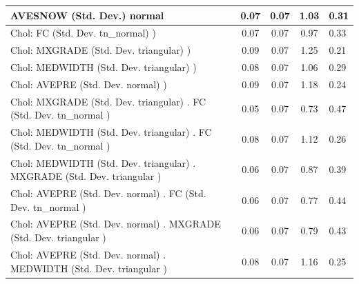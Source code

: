 \begin{table}
\begin{center}
\begin{tabular}{|l|l|c|c|c|l|}
			\hline
			AVESNOW (Std. Dev.) normal &  & 0.07 & 0.07 & 1.03 & 0.31 \\
			\hline
			 Chol: FC (Std. Dev. tn_normal) ) &  & 0.07 & 0.07 & 0.97 & 0.33 \\
			\hline
			 Chol: MXGRADE (Std. Dev. triangular) ) &  & 0.09 & 0.07 & 1.25 & 0.21 \\
			\hline
			 Chol: MEDWIDTH (Std. Dev. triangular) ) &  & 0.08 & 0.07 & 1.06 & 0.29 \\
			\hline
			 Chol: AVEPRE (Std. Dev. normal) ) &  & 0.09 & 0.07 & 1.18 & 0.24 \\
			\hline
			 Chol: MXGRADE (Std. Dev. triangular) . FC (Std. Dev.   tn_normal ) &  & 0.05 & 0.07 & 0.73 & 0.47 \\
			\hline
			 Chol: MEDWIDTH (Std. Dev. triangular) . FC (Std. Dev.   tn_normal ) &  & 0.08 & 0.07 & 1.12 & 0.26 \\
			\hline
			 Chol: MEDWIDTH (Std. Dev. triangular) . MXGRADE (Std. Dev.   triangular ) &  & 0.06 & 0.07 & 0.87 & 0.39 \\
			\hline
			 Chol: AVEPRE (Std. Dev. normal) . FC (Std. Dev.   tn_normal ) &  & 0.06 & 0.07 & 0.77 & 0.44 \\
			\hline
			 Chol: AVEPRE (Std. Dev. normal) . MXGRADE (Std. Dev.   triangular ) &  & 0.06 & 0.07 & 0.79 & 0.43 \\
			\hline
			 Chol: AVEPRE (Std. Dev. normal) . MEDWIDTH (Std. Dev.   triangular ) &  & 0.08 & 0.07 & 1.16 & 0.25 \\
			\hline
		\end{tabular}
	\end{center}
\end{table}
